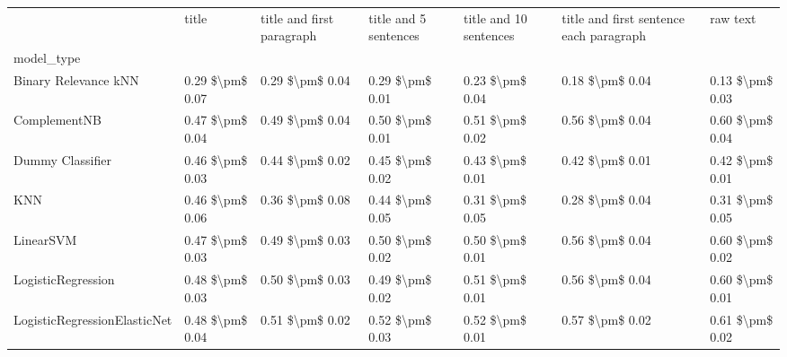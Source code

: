 \begin{tabular}{lllllll}
\toprule
{} &            title & title and first paragraph & title and 5 sentences & title and 10 sentences & title and first sentence each paragraph &             raw text \\
model\_type                      &                  &                           &                       &                        &                                         &                      \\
\midrule
Binary Relevance kNN            &  0.29 \$\textbackslash pm\$ 0.07 &           0.29 \$\textbackslash pm\$ 0.04 &       0.29 \$\textbackslash pm\$ 0.01 &        0.23 \$\textbackslash pm\$ 0.04 &                         0.18 \$\textbackslash pm\$ 0.04 &      0.13 \$\textbackslash pm\$ 0.03 \\
ComplementNB                    &  0.47 \$\textbackslash pm\$ 0.04 &           0.49 \$\textbackslash pm\$ 0.04 &       0.50 \$\textbackslash pm\$ 0.01 &        0.51 \$\textbackslash pm\$ 0.02 &                         0.56 \$\textbackslash pm\$ 0.04 &      0.60 \$\textbackslash pm\$ 0.04 \\
Dummy Classifier                &  0.46 \$\textbackslash pm\$ 0.03 &           0.44 \$\textbackslash pm\$ 0.02 &       0.45 \$\textbackslash pm\$ 0.02 &        0.43 \$\textbackslash pm\$ 0.01 &                         0.42 \$\textbackslash pm\$ 0.01 &      0.42 \$\textbackslash pm\$ 0.01 \\
KNN                             &  0.46 \$\textbackslash pm\$ 0.06 &           0.36 \$\textbackslash pm\$ 0.08 &       0.44 \$\textbackslash pm\$ 0.05 &        0.31 \$\textbackslash pm\$ 0.05 &                         0.28 \$\textbackslash pm\$ 0.04 &      0.31 \$\textbackslash pm\$ 0.05 \\
LinearSVM                       &  0.47 \$\textbackslash pm\$ 0.03 &           0.49 \$\textbackslash pm\$ 0.03 &       0.50 \$\textbackslash pm\$ 0.02 &        0.50 \$\textbackslash pm\$ 0.01 &                         0.56 \$\textbackslash pm\$ 0.04 &      0.60 \$\textbackslash pm\$ 0.02 \\
LogisticRegression              &  0.48 \$\textbackslash pm\$ 0.03 &           0.50 \$\textbackslash pm\$ 0.03 &       0.49 \$\textbackslash pm\$ 0.02 &        0.51 \$\textbackslash pm\$ 0.01 &                         0.56 \$\textbackslash pm\$ 0.04 &      0.60 \$\textbackslash pm\$ 0.01 \\
LogisticRegressionElasticNet    &  0.48 \$\textbackslash pm\$ 0.04 &           0.51 \$\textbackslash pm\$ 0.02 &       0.52 \$\textbackslash pm\$ 0.03 &        0.52 \$\textbackslash pm\$ 0.01 &                         0.57 \$\textbackslash pm\$ 0.02 &      0.61 \$\textbackslash pm\$ 0.02 \\

\end{tabular}
